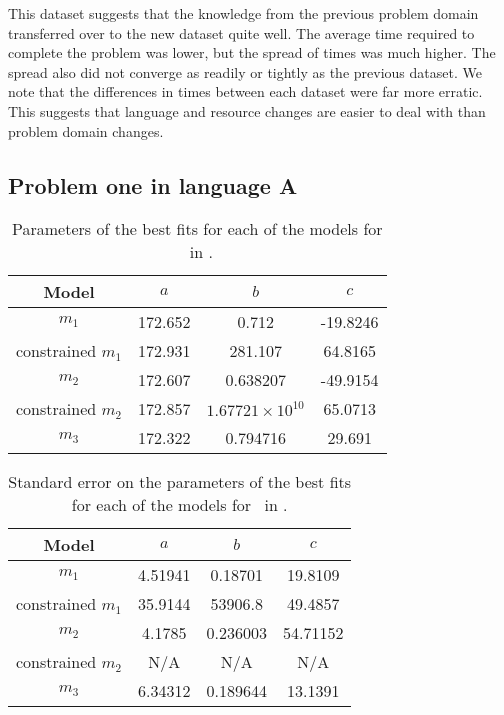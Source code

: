 This dataset suggests that the knowledge from the previous problem domain transferred
over to the new dataset quite well.
The average time required to complete the problem was lower, but the spread of times was much higher.
The spread also did not converge as readily or tightly as the previous dataset.
We note that the differences in times between each dataset were far more erratic.
This suggests that language and resource changes are easier to deal with than problem domain
changes.

\subsection{Problem one in language A} \label{subsecP1LA}

\begin{table}[ht!]
\centering
\begin{tabular}{|c|c|c|c|}
\hline
{\bf Model} &  $a$ & $b$ & $c$ \\
\hline
$m_1$ & 172.652 & 0.712 & -19.8246 \\
\hline
constrained $m_1$ & 172.931 & 281.107 & 64.8165 \\
\hline
$m_2$ & 172.607 & 0.638207 & -49.9154\\
\hline
constrained $m_2$ & 172.857 & $1.67721 \times 10^10$ & 65.0713 \\
\hline
$m_3$ & 172.322 & 0.794716 & 29.691 \\
\hline
\end{tabular}
\caption{Parameters of the best fits for each of the models for \PO\ in \LA.}
\label{table:P1LA:abc}
\end{table}

\begin{table}[ht!]
\centering
\begin{tabular}{|c|c|c|c|}
\hline
{\bf Model} &  $a$ & $b$ & $c$ \\
\hline
$m_1$ & 4.51941 & 0.18701 & 19.8109 \\
\hline
constrained $m_1$ & 35.9144 & 53906.8 & 49.4857 \\
\hline
$m_2$ & 4.1785 & 0.236003 & 54.71152\\
\hline
constrained $m_2$ & N/A & N/A & N/A \\
\hline
$m_3$ & 6.34312 & 0.189644 & 13.1391 \\
\hline
\end{tabular}
\caption{Standard error on the parameters of the best fits for each of the models for \PO\ in \LA.}
\label{table:P1LA:abc:error}
\end{table}

